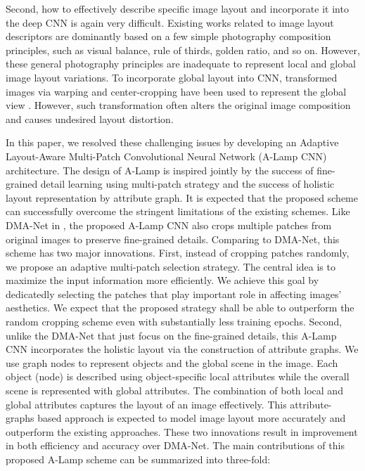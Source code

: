\documentclass[10pt,twocolumn,letterpaper]{article}
\begin{document}
Second, how to effectively describe specific image layout and incorporate it into the deep CNN is again very difficult. Existing works related to image layout descriptors are dominantly based on a few simple photography composition principles, such as visual balance, rule of thirds, golden ratio, and so on. However, these general photography principles are inadequate to represent local and global image layout variations. To incorporate global layout into CNN, transformed images via warping and center-cropping have been used to represent the global view \cite{Lu:2014:TMM:rating}.
However, such transformation often alters the original image composition and causes undesired layout distortion. 

In this paper, we resolved these challenging issues by developing an Adaptive Layout-Aware Multi-Patch Convolutional Neural Network (A-Lamp CNN) architecture. The design of A-Lamp is inspired jointly by the success of fine-grained detail learning using multi-patch strategy \cite{Lu:2015:ICCV,Liu:2016:CVPR:multi_patch} and the success of holistic layout representation by attribute graph. It is expected that the proposed scheme can successfully overcome the stringent limitations of the existing schemes.
Like DMA-Net in \cite{Lu:2015:ICCV}, the proposed A-Lamp CNN also crops multiple patches from original images to preserve fine-grained details. Comparing to DMA-Net, this scheme has two major innovations. First, instead of cropping patches randomly, we propose an adaptive multi-patch selection strategy. The central idea is to maximize the input information more efficiently. We achieve this goal by dedicatedly selecting the patches that play important role in affecting images' aesthetics. We expect that the proposed strategy shall be able to outperform the random cropping scheme even with substantially less training epochs. Second, unlike the DMA-Net that just focus on the fine-grained details, this A-Lamp CNN incorporates the holistic layout via the construction of attribute graphs. We use graph nodes to represent objects and the global scene in the image. Each object (node) is described using object-specific local attributes while the overall scene is represented with global attributes. The combination of both local and global attributes captures the layout of an image effectively. This attribute-graphs based approach is expected to model image layout more accurately and outperform the existing approaches. These two innovations result in improvement in both efficiency and accuracy over DMA-Net. The main contributions of this proposed A-Lamp scheme can be summarized into three-fold:
\end{document}
